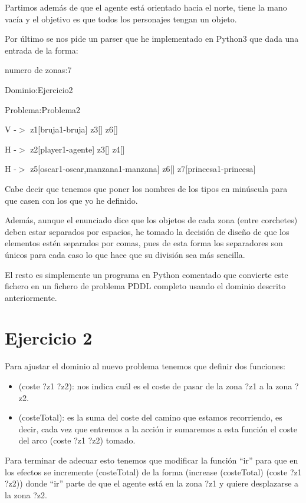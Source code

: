 \documentclass[12pt,a4paper]{article}
\begin{document}
Partimos además de que el agente está orientado hacia el norte, tiene la mano vacía y el objetivo es que todos los personajes tengan un objeto.

Por último se nos pide un parser que he implementado en Python3 que dada una entrada de la forma:

numero de zonas:7

Dominio:Ejercicio2

Problema:Problema2

V -$>$ z1[bruja1-bruja] z3[] z6[]

H -$>$ z2[player1-agente] z3[] z4[]

H -$>$ z5[oscar1-oscar,manzana1-manzana] z6[] z7[princesa1-princesa]

Cabe decir que tenemos que poner los nombres de los tipos en minúscula para que casen con los que yo he definido.

Además, aunque el enunciado dice que los objetos de cada zona (entre corchetes) deben estar separados por espacios, he tomado la decisión de diseño de que los elementos estén separados por comas, pues de  esta forma los separadores son únicos para cada caso lo que hace que su división sea más sencilla.

El resto es simplemente un programa en Python comentado que convierte este fichero en un fichero de problema PDDL completo usando el dominio descrito anteriormente.

\section{Ejercicio 2}

Para ajustar el dominio al nuevo problema tenemos que definir dos funciones:

\begin{itemize}
	\item (coste ?z1 ?z2): nos indica cuál es el coste de pasar de la zona ?z1 a la zona ?z2.
	\item (costeTotal): es la suma del coste del camino que estamos recorriendo, es decir, cada vez que entremos a la acción ir sumaremos a esta función el coste del arco (coste ?z1 ?z2) tomado.
\end{itemize}

Para terminar de adecuar esto tenemos que modificar la función ``ir'' para que en los efectos se incremente (costeTotal) de la forma (increase (costeTotal) (coste ?z1 ?z2)) donde ``ir'' parte de que el agente está en la zona ?z1 y quiere desplazarse a la zona ?z2.
\end{document}
